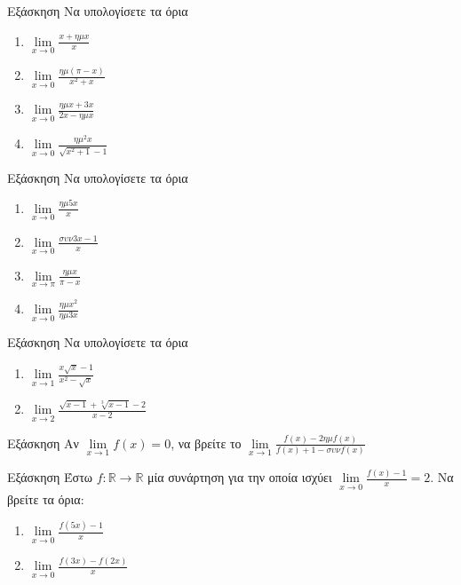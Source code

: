 \documentclass[greek]{beamer}
\begin{document}
\begin{frame}{Εξάσκηση}
 Να υπολογίσετε τα όρια
 \begin{enumerate}
  \item $\lim\limits_{x \to 0}{ \frac{x+ημx}{x} }$ \pause
  \item $\lim\limits_{x \to 0}{ \frac{ημ(π-x)}{x^2+x} }$ \pause
  \item $\lim\limits_{x \to 0}{ \frac{ημx+3x}{2x-ημx} }$ \pause
  \item $\lim\limits_{x \to 0}{ \frac{ημ^2x}{\sqrt{x^2+1}-1} }$
 \end{enumerate}
\end{frame}

\begin{frame}{Εξάσκηση}
 Να υπολογίσετε τα όρια
 \begin{enumerate}
  \item $\lim\limits_{x \to 0}{ \frac{ημ5x}{x} }$ \pause
  \item $\lim\limits_{x \to 0}{ \frac{συν3x-1}{x} }$ \pause
  \item $\lim\limits_{x \to π}{ \frac{ημx}{π-x} }$ \pause
  \item $\lim\limits_{x \to 0}{ \frac{ημx^2}{ημ3x} }$
 \end{enumerate}
\end{frame}

\begin{frame}{Εξάσκηση}
 Να υπολογίσετε τα όρια
 \begin{enumerate}
  \item $\lim\limits_{x \to 1}{ \frac{x\sqrt{x}-1}{x^2-\sqrt{x}} }$ \pause
  \item $\lim\limits_{x \to 2}{ \frac{\sqrt{x-1}+\sqrt[3]{x-1}-2}{x-2} }$
 \end{enumerate}
\end{frame}

\begin{frame}{Εξάσκηση}
 Αν $\lim\limits_{x \to 1}{ f(x) }=0$, να βρείτε το $\lim\limits_{x \to 1}{ \frac{f(x)-2ημf(x)}{f(x)+1-συνf(x)} }$
\end{frame}

\begin{frame}{Εξάσκηση}
 Έστω $f:\mathbb{R}\to\mathbb{R}$ μία συνάρτηση για την οποία ισχύει $\lim\limits_{x \to 0}{ \frac{f(x)-1}{x} }=2$. Να βρείτε τα όρια:
 \begin{enumerate}
  \item $\lim\limits_{x \to 0}{ \frac{f(5x)-1}{x} }$ \pause
  \item $\lim\limits_{x \to 0}{ \frac{f(3x)-f(2x)}{x} }$
 \end{enumerate}
\end{frame}
\end{document}

